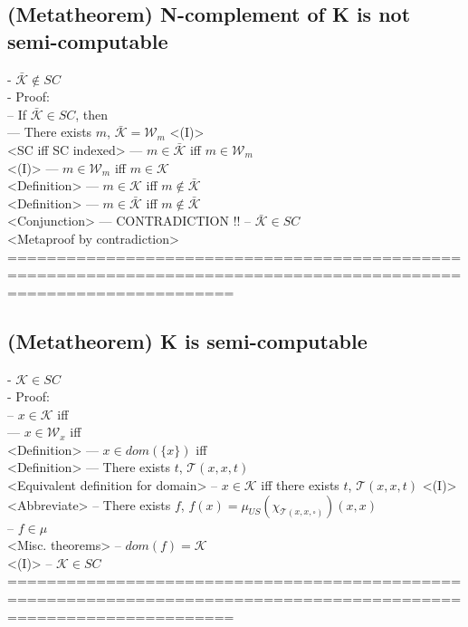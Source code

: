 \documentclass{book}
\newcommand{\inot}{\not}
\newcommand{\placeholder}{\square}
\begin{document}
\subsection{(Metatheorem) N-complement of K is not semi-computable} %
	- $\bar{\mathcal{K}} \inot \in SC$ \\
	- Proof: \\
		-- If $\bar{\mathcal{K}} \in SC$, then \\
			--- There exists $m$, $\bar{\mathcal{K}} = \mathcal{W}_m$ <(I)> \\ <SC iff SC indexed>
			--- $m \in \bar{\mathcal{K}}$ iff $m \in \mathcal{W}_m$ \\ <(I)>
			--- $m \in \mathcal{W}_m$ iff $m \in \mathcal{K}$ \\ <Definition>
			--- $m \in \mathcal{K}$ iff $m \inot \in \bar{\mathcal{K}}$ \\ <Definition>
			--- $m \in \bar{\mathcal{K}}$ iff $m \inot \in \bar{\mathcal{K}}$ \\ <Conjunction>
			--- CONTRADICTION !!
		-- $\bar{\mathcal{K}} \in SC$ \\ <Metaproof by contradiction>
	===================================================================================================================
\subsection{(Metatheorem) K is semi-computable} %
	- $\mathcal{K} \in SC$ \\
	- Proof: \\
		-- $x \in \mathcal{K}$ iff \\
			--- $x \in \mathcal{W}_x$ iff \\ <Definition>
			--- $x \in dom(\{x\})$ iff \\ <Definition>
			--- There exists $t$, $\mathcal{T}(x, x, t)$ \\ <Equivalent definition for domain>
		-- $x \in \mathcal{K}$ iff there exists $t$, $\mathcal{T}(x, x, t)$ <(I)> \\ <Abbreviate>
		-- There exists $f$, $f(x) = \mu_{US}(\chi_{\mathcal{T}(x, x, \placeholder)})(x, x)$ \\
		-- $f \in \mu$ \\ <Misc. theorems>
		-- $dom(f) = \mathcal{K}$ \\ <(I)>
		-- $\mathcal{K} \in SC$ \\
	===================================================================================================================
\end{document}

